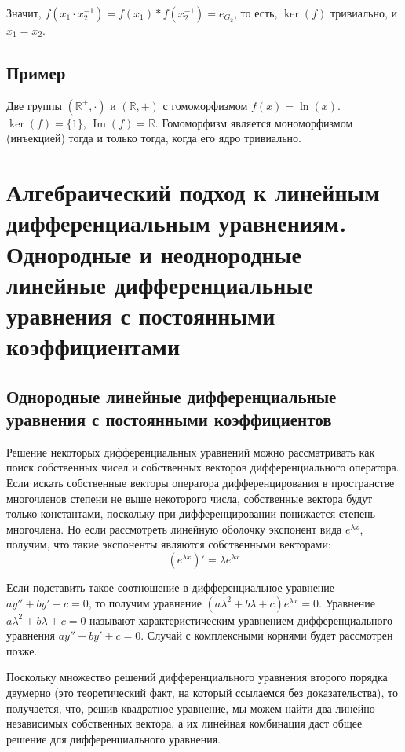 \documentclass[12pt]{article}
\begin{document}
    Значит, $f(x_1\cdot x_2^{-1})=f(x_1)*f(x_2^{-1})=e_{G_2}$, то есть, $\operatorname{ker}(f)$ тривиально, и $x_1=x_2$.

    \subsection{Пример}

    Две группы $(\mathbb{R}^{+},\cdot)$ и $(\mathbb{R},+)$ с гомоморфизмом $f(x) = \ln(x)$. $\ker(f) = \{1\}$, $\operatorname{Im}(f) = \mathbb{R}$. Гомоморфизм является мономорфизмом (инъекцией) тогда и только тогда, когда его ядро тривиально.

    \section{Алгебраический подход к линейным дифференциальным уравнениям. Однородные и неоднородные линейные дифференциальные уравнения с постоянными коэффициентами}

    \subsection{Однородные линейные дифференциальные уравнения с постоянными коэффициентов}
    Решение некоторых дифференциальных уравнений можно рассматривать как поиск
    собственных чисел и собственных векторов дифференциального оператора.  Если искать собственные векторы оператора дифференцирования в пространстве многочленов степени не выше некоторого числа, собственные вектора будут только константами, поскольку при дифференцировании понижается степень многочлена. Но если рассмотреть линейную оболочку экспонент вида $e^{\lambda x}$, получим, что такие экспоненты являются собственными векторами:
    \[
        (e^{\lambda x})' = \lambda e^{\lambda x}
    \]

    Если подставить такое соотношение в дифференциальное уравнение $ay'' + by' + c = 0$, то получим уравнение $(a\lambda^2 + b\lambda + c)e^{\lambda x} = 0$.
    Уравнение $a\lambda^2 + b\lambda + c = 0$ называют характеристическим уравнением дифференциального уравнения $ay'' + by' + c = 0$. Случай с комплексными корнями будет рассмотрен позже.

    Поскольку множество решений дифференциального уравнения второго порядка двумерно (это теоретический факт, на который ссылаемся без доказательства), то получается, что, решив квадратное уравнение, мы можем найти два линейно независимых собственных вектора, а их линейная комбинация даст общее решение для дифференциального уравнения.
\end{document}
